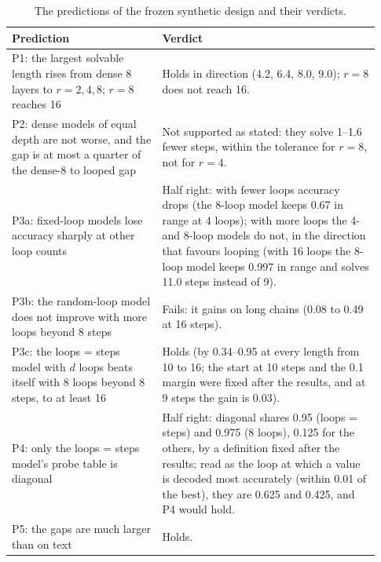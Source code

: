 \begin{table}[h]
  \centering
  \caption{The predictions of the frozen synthetic design and their verdicts.}
  \label{tab:p1p5}
  \small
  \begin{tabular}{p{0.38\linewidth}p{0.55\linewidth}}
    \toprule
    Prediction & Verdict \\
    \midrule
    P1: the largest solvable length rises from dense 8 layers to $r = 2, 4, 8$; $r = 8$ reaches 16 & Holds in direction (4.2,
    6.4, 8.0, 9.0); $r = 8$ does not reach 16. \\
    P2: dense models of equal depth are not worse, and the gap is at most a quarter of the dense-8 to looped gap & Not
    supported as stated: they solve 1--1.6 fewer steps, within the tolerance for $r = 8$, not for $r = 4$. \\
    P3a: fixed-loop models lose accuracy sharply at other loop counts & Half right: with fewer loops accuracy drops (the
    8-loop model keeps 0.67 in range at 4 loops); with more loops the 4- and 8-loop models do not, in the direction that favours looping (with 16
    loops the 8-loop model keeps 0.997 in range and solves 11.0 steps instead of 9). \\
    P3b: the random-loop model does not improve with more loops beyond 8 steps & Fails: it gains on long chains (0.08 to
    0.49 at 16 steps). \\
    P3c: the loops = steps model with $d$ loops beats itself with 8 loops beyond 8 steps, to at least 16 & Holds (by 0.34--0.95 at
    every length from 10 to 16; the start at 10 steps and the 0.1 margin were fixed after the results, and at 9 steps the
    gain is 0.03). \\
    P4: only the loops = steps model's probe table is diagonal & Half right: diagonal shares 0.95 (loops = steps) and 0.975
    (8 loops), 0.125 for the others, by a definition fixed after the results; read as the loop at which a value is decoded
    most accurately (within 0.01 of the best), they are 0.625 and 0.425, and P4 would hold. \\
    P5: the gaps are much larger than on text & Holds. \\
    \bottomrule
  \end{tabular}
\end{table}

